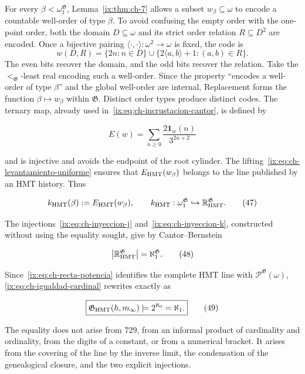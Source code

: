 For every \(\beta<\omega_1^{\mathfrak G}\), Lemma~\ref{ix:thm:ch-7} allows a subset
\(w_\beta\subseteq\omega\) to encode a countable well-order of type
\(\beta\). To avoid confusing the empty order with the
one-point order, both the domain \(D\subseteq\omega\) and its strict order
relation \(R\subseteq D^2\) are encoded. Once a bijective pairing
\(\langle\cdot,\cdot\rangle:\omega^2\to\omega\) is fixed, the code is
\[
 w(D,R)=\{2n:n\in D\}\cup
        \{2\langle a,b\rangle+1:(a,b)\in R\}.
\]
The even bits recover the domain, and the odd bits recover the relation. Take
the \(<_{\mathfrak G}\)-least real encoding such a well-order. Since the
property “encodes a well-order of type \(\beta\)” and the global well-order are
internal, Replacement forms the function \(\beta\mapsto w_\beta\) within
\(\mathfrak G\). Distinct order types produce distinct codes. The ternary map,
already used in~\eqref{ix:eq:ch-incrustacion-cantor}, is defined by

\[
 E(w)=\sum_{n\ge0}\frac{2\mathbf1_w(n)}{3^{2n+2}}
\tag{46}\label{ix:eq:ch-incrustacion-ternaria}
\]

and is injective and avoids the endpoint of the root cylinder. The lifting~\eqref{ix:eq:ch-levantamiento-uniforme}
ensures that \(E_{\rm HMT}(w_\beta)\) belongs to the line published by an
HMT history. Thus

\[
 k_{\rm HMT}(\beta):=E_{\rm HMT}(w_\beta),
 \qquad
 k_{\rm HMT}:\omega_1^{\mathfrak G}
 \hookrightarrow\mathbb R_{\rm HMT}^{\mathfrak G}.
\tag{47}\label{ix:eq:ch-inyeccion-k}
\]

The injections~\eqref{ix:eq:ch-inyeccion-j} and~\eqref{ix:eq:ch-inyeccion-k},
constructed without using the equality sought, give by Cantor--Bernstein

\[
 \bigl|\mathbb R_{\rm HMT}^{\mathfrak G}\bigr|
 =\aleph_1^{\mathfrak G}.
\tag{48}\label{ix:eq:ch-igualdad-cardinal}
\]

Since~\eqref{ix:eq:ch-recta-potencia} identifies the complete HMT line with
\(\mathcal P^{\mathfrak G}(\omega)\), \eqref{ix:eq:ch-igualdad-cardinal} rewrites
exactly as

\[
 \boxed{
  \mathfrak G_{\rm HMT}(h,m_\infty)
  \models 2^{\aleph_0}=\aleph_1.}
\tag{49}\label{ix:eq:ch-decision}
\]

The equality does not arise from \(729\), from an informal product of
cardinality and ordinality, from the digits of a constant, or from a numerical
bracket. It arises from the covering of the line by the inverse limit, the
condensation of the genealogical closure, and the two explicit injections.

